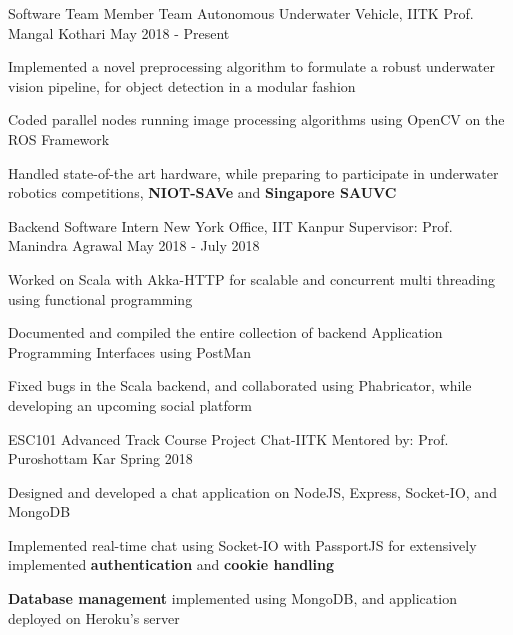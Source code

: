 
\begin{cventries}

  \cventry
    {Software Team Member}
    {Team Autonomous Underwater Vehicle, IITK}
    {Prof. Mangal Kothari}
    {May 2018 - Present}
    {
      \begin{cvitems}
        \item {Implemented a novel preprocessing algorithm to formulate a robust underwater vision pipeline, for object detection in a modular fashion}
        \item {Coded parallel nodes running image processing algorithms using OpenCV on the ROS Framework}
        \item {Handled state-of-the art hardware, while preparing to participate in underwater robotics competitions, \textbf{NIOT-SAVe} and \textbf{Singapore SAUVC} }
      \end{cvitems}
    }

  \cventry
    {Backend Software Intern}
    {New York Office, IIT Kanpur}
    {Supervisor: Prof. Manindra Agrawal}
    {May 2018 - July 2018}
    {
      \begin{cvitems}
        \item{Worked on Scala with Akka-HTTP for scalable and concurrent multi threading using functional programming}
        \item{Documented and compiled the entire collection of backend Application Programming Interfaces using PostMan}
        \item{Fixed bugs in the Scala backend, and collaborated using Phabricator, while developing an upcoming social platform}
      \end{cvitems}
    }

  \cventry
    {ESC101 Advanced Track Course Project}
    {Chat-IITK}
    {Mentored by: Prof. Puroshottam Kar}
    {Spring 2018}
    {
      \begin{cvitems}
        \item {Designed and developed a chat application on NodeJS, Express, Socket-IO, and MongoDB}
        \item {Implemented real-time chat using Socket-IO with PassportJS for extensively implemented \textbf{authentication} and \textbf{cookie handling}}
        \item {\textbf{Database management} implemented using MongoDB, and application deployed on Heroku's server}
      \end{cvitems}
    }

\end{cventries}
